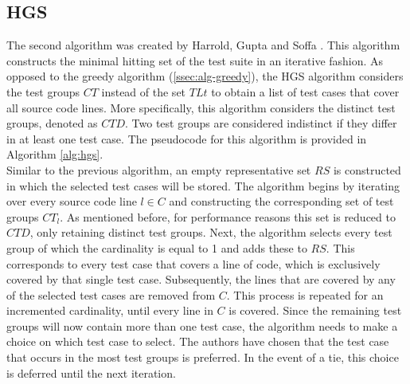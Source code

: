 
\subsection{HGS}\label{ssec:alg-hgs}
The second algorithm was created by Harrold, Gupta and Soffa \cite{hgs}. This algorithm constructs the minimal hitting set of the test suite in an iterative fashion. As opposed to the greedy algorithm (\autoref{ssec:alg-greedy}), the HGS algorithm considers the test groups $CT$ instead of the set $TLt$ to obtain a list of test cases that cover all source code lines. More specifically, this algorithm considers the distinct test groups, denoted as $CTD$. Two test groups are considered indistinct if they differ in at least one test case. The pseudocode for this algorithm is provided in Algorithm \autoref{alg:hgs}.\\

\noindent Similar to the previous algorithm, an empty representative set $RS$ is constructed in which the selected test cases will be stored. The algorithm begins by iterating over every source code line $l \in C$ and constructing the corresponding set of test groups $CT_l$. As mentioned before, for performance reasons this set is reduced to $CTD$, only retaining distinct test groups. Next, the algorithm selects every test group of which the cardinality is equal to 1 and adds these to $RS$. This corresponds to every test case that covers a line of code, which is exclusively covered by that single test case. Subsequently, the lines that are covered by any of the selected test cases are removed from $C$. This process is repeated for an incremented cardinality, until every line in $C$ is covered. Since the remaining test groups will now contain more than one test case, the algorithm needs to make a choice on which test case to select. The authors have chosen that the test case that occurs in the most test groups is preferred. In the event of a tie, this choice is deferred until the next iteration.\\

